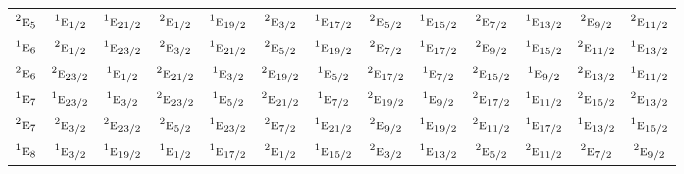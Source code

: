 \documentclass[10pt,a4paper]{article}
\numberwithin{equation}{section}
\newcommand{\irr}[1]{\text{\normalfont\scshape #1}}
\newcommand{\conjpair}[1]{{}^{#1}}
\begin{document}
{\begin{longtable}{@{}lcccccccccccc@{}}
$\conjpair{2}\irr{e}_{5}$ & $\conjpair{1}\irr{e}_{1/2}$ & $\conjpair{1}\irr{e}_{21/2}$ & $\conjpair{2}\irr{e}_{1/2}$ & $\conjpair{1}\irr{e}_{19/2}$ & $\conjpair{2}\irr{e}_{3/2}$ & $\conjpair{1}\irr{e}_{17/2}$ & $\conjpair{2}\irr{e}_{5/2}$ & $\conjpair{1}\irr{e}_{15/2}$ & $\conjpair{2}\irr{e}_{7/2}$ & $\conjpair{1}\irr{e}_{13/2}$ & $\conjpair{2}\irr{e}_{9/2}$ & $\conjpair{2}\irr{e}_{11/2}$\\
$\conjpair{1}\irr{e}_{6}$ & $\conjpair{2}\irr{e}_{1/2}$ & $\conjpair{1}\irr{e}_{23/2}$ & $\conjpair{2}\irr{e}_{3/2}$ & $\conjpair{1}\irr{e}_{21/2}$ & $\conjpair{2}\irr{e}_{5/2}$ & $\conjpair{1}\irr{e}_{19/2}$ & $\conjpair{2}\irr{e}_{7/2}$ & $\conjpair{1}\irr{e}_{17/2}$ & $\conjpair{2}\irr{e}_{9/2}$ & $\conjpair{1}\irr{e}_{15/2}$ & $\conjpair{2}\irr{e}_{11/2}$ & $\conjpair{1}\irr{e}_{13/2}$\\
$\conjpair{2}\irr{e}_{6}$ & $\conjpair{2}\irr{e}_{23/2}$ & $\conjpair{1}\irr{e}_{1/2}$ & $\conjpair{2}\irr{e}_{21/2}$ & $\conjpair{1}\irr{e}_{3/2}$ & $\conjpair{2}\irr{e}_{19/2}$ & $\conjpair{1}\irr{e}_{5/2}$ & $\conjpair{2}\irr{e}_{17/2}$ & $\conjpair{1}\irr{e}_{7/2}$ & $\conjpair{2}\irr{e}_{15/2}$ & $\conjpair{1}\irr{e}_{9/2}$ & $\conjpair{2}\irr{e}_{13/2}$ & $\conjpair{1}\irr{e}_{11/2}$\\
$\conjpair{1}\irr{e}_{7}$ & $\conjpair{1}\irr{e}_{23/2}$ & $\conjpair{1}\irr{e}_{3/2}$ & $\conjpair{2}\irr{e}_{23/2}$ & $\conjpair{1}\irr{e}_{5/2}$ & $\conjpair{2}\irr{e}_{21/2}$ & $\conjpair{1}\irr{e}_{7/2}$ & $\conjpair{2}\irr{e}_{19/2}$ & $\conjpair{1}\irr{e}_{9/2}$ & $\conjpair{2}\irr{e}_{17/2}$ & $\conjpair{1}\irr{e}_{11/2}$ & $\conjpair{2}\irr{e}_{15/2}$ & $\conjpair{2}\irr{e}_{13/2}$\\
$\conjpair{2}\irr{e}_{7}$ & $\conjpair{2}\irr{e}_{3/2}$ & $\conjpair{2}\irr{e}_{23/2}$ & $\conjpair{2}\irr{e}_{5/2}$ & $\conjpair{1}\irr{e}_{23/2}$ & $\conjpair{2}\irr{e}_{7/2}$ & $\conjpair{1}\irr{e}_{21/2}$ & $\conjpair{2}\irr{e}_{9/2}$ & $\conjpair{1}\irr{e}_{19/2}$ & $\conjpair{2}\irr{e}_{11/2}$ & $\conjpair{1}\irr{e}_{17/2}$ & $\conjpair{1}\irr{e}_{13/2}$ & $\conjpair{1}\irr{e}_{15/2}$\\
$\conjpair{1}\irr{e}_{8}$ & $\conjpair{1}\irr{e}_{3/2}$ & $\conjpair{1}\irr{e}_{19/2}$ & $\conjpair{1}\irr{e}_{1/2}$ & $\conjpair{1}\irr{e}_{17/2}$ & $\conjpair{2}\irr{e}_{1/2}$ & $\conjpair{1}\irr{e}_{15/2}$ & $\conjpair{2}\irr{e}_{3/2}$ & $\conjpair{1}\irr{e}_{13/2}$ & $\conjpair{2}\irr{e}_{5/2}$ & $\conjpair{2}\irr{e}_{11/2}$ & $\conjpair{2}\irr{e}_{7/2}$ & $\conjpair{2}\irr{e}_{9/2}$\\

\end{longtable}}
\end{document}
